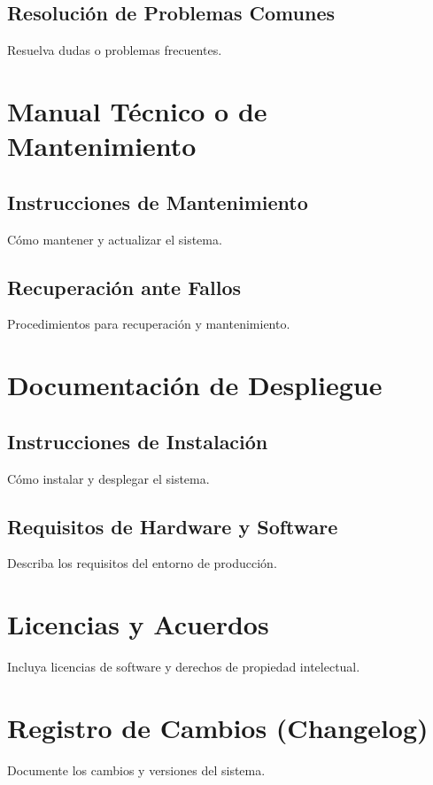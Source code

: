 \documentclass[a4paper, 12pt]{report}
\begin{document}
	\section{Resolución de Problemas Comunes}
	Resuelva dudas o problemas frecuentes.
	
	\chapter{Manual Técnico o de Mantenimiento}
	\section{Instrucciones de Mantenimiento}
	Cómo mantener y actualizar el sistema.
	
	\section{Recuperación ante Fallos}
	Procedimientos para recuperación y mantenimiento.
	
	\chapter{Documentación de Despliegue}
	\section{Instrucciones de Instalación}
	Cómo instalar y desplegar el sistema.
	
	\section{Requisitos de Hardware y Software}
	Describa los requisitos del entorno de producción.
	
	\chapter{Licencias y Acuerdos}
	Incluya licencias de software y derechos de propiedad intelectual.
	
	\chapter{Registro de Cambios (Changelog)}
	Documente los cambios y versiones del sistema.
	
\end{document}
